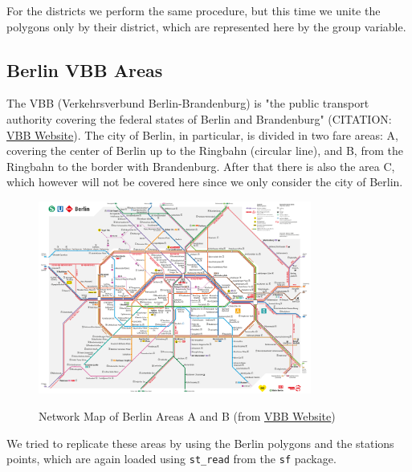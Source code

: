 For the districts we perform the same procedure, but this time we unite the polygons only by their district, which are represented here by the group variable.

\subsection{Berlin VBB Areas}

The VBB (Verkehrsverbund Berlin-Brandenburg) is "the public transport authority covering the federal states of Berlin and Brandenburg" (CITATION: \href{https://www.vbb.de/en/about-us/the-company-vbb}{VBB Website}). The city of Berlin, in particular, is divided in two fare areas: A, covering the center of Berlin up to the Ringbahn (circular line), and B, from the Ringbahn to the border with Brandenburg. After that there is also the area C, which however will not be covered here since we only consider the city of Berlin.

\begin{figure}[H]
\begin{center}
\includegraphics[width=0.8\textwidth, keepaspectratio]{S_und_U-Bahnnetz_mit_Regionalbahn_Innenstadt.pdf} \\
\caption{Network Map of Berlin Areas A and B (from \href{https://www.vbb.de/en/timetables/network-maps}{VBB Website})}
\end{center}
\end{figure}

We tried to replicate these areas by using the Berlin polygons and the stations points, which are again loaded using \texttt{st\_read} from the \texttt{sf} package.



